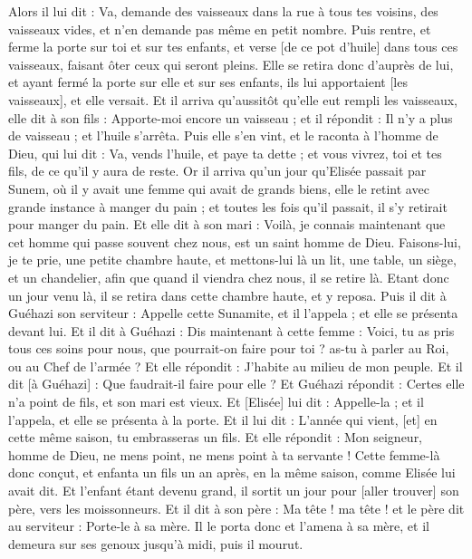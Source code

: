 \begin{multicols}{2}
Alors il lui dit : Va, demande des vaisseaux dans la rue à tous tes voisins, des vaisseaux vides, et n'en demande pas même en petit nombre.
Puis rentre, et ferme la porte sur toi et sur tes enfants, et verse [de ce pot d'huile] dans tous ces vaisseaux, faisant ôter ceux qui seront pleins.
Elle se retira donc d'auprès de lui, et ayant fermé la porte sur elle et sur ses enfants, ils lui apportaient [les vaisseaux], et elle versait.
Et il arriva qu'aussitôt qu'elle eut rempli les vaisseaux, elle dit à son fils : Apporte-moi encore un vaisseau ; et il répondit : Il n'y a plus de vaisseau ; et l'huile s'arrêta.
Puis elle s'en vint, et le raconta à l'homme de Dieu, qui lui dit : Va, vends l'huile, et paye ta dette ; et vous vivrez, toi et tes fils, de ce qu'il y aura de reste.
Or il arriva qu'un jour qu'Elisée passait par Sunem, où il y avait une femme qui avait de grands biens, elle le retint avec grande instance à manger du pain ; et toutes les fois qu'il passait, il s'y retirait pour manger du pain.
Et elle dit à son mari : Voilà, je connais maintenant que cet homme qui passe souvent chez nous, est un saint homme de Dieu.
Faisons-lui, je te prie, une petite chambre haute, et mettons-lui là un lit, une table, un siège, et un chandelier, afin que quand il viendra chez nous, il se retire là.
Etant donc un jour venu là, il se retira dans cette chambre haute, et y reposa.
Puis il dit à Guéhazi son serviteur : Appelle cette Sunamite, et il l'appela ; et elle se présenta devant lui.
Et il dit à Guéhazi : Dis maintenant à cette femme : Voici, tu as pris tous ces soins pour nous, que pourrait-on faire pour toi ? as-tu à parler au Roi, ou au Chef de l'armée ? Et elle répondit : J'habite au milieu de mon peuple.
Et il dit [à Guéhazi] : Que faudrait-il faire pour elle ? Et Guéhazi répondit : Certes elle n'a point de fils, et son mari est vieux.
Et [Elisée] lui dit : Appelle-la ; et il l'appela, et elle se présenta à la porte.
Et il lui dit : L'année qui vient, [et] en cette même saison, tu embrasseras un fils. Et elle répondit : Mon seigneur, homme de Dieu, ne mens point, ne mens point à ta servante !
Cette femme-là donc conçut, et enfanta un fils un an après, en la même saison, comme Elisée lui avait dit.
Et l'enfant étant devenu grand, il sortit un jour pour [aller trouver] son père, vers les moissonneurs.
Et il dit à son père : Ma tête ! ma tête ! et le père dit au serviteur : Porte-le à sa mère.
Il le porta donc et l'amena à sa mère, et il demeura sur ses genoux jusqu'à midi, puis il mourut.

\end{multicols}
